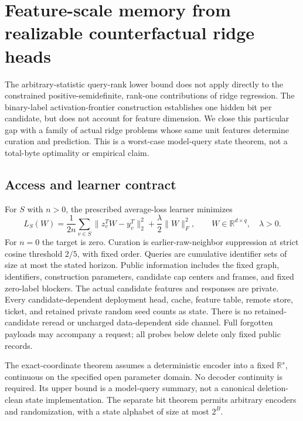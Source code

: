 \section{Feature-scale memory from realizable counterfactual ridge heads}
\label{sec:realizable-feature-memory}

The arbitrary-statistic query-rank lower bound does not apply directly to
the constrained positive-semidefinite, rank-one contributions of ridge
regression.  The binary-label activation-frontier construction establishes
one hidden bit per candidate, but does not account for feature dimension.
We close this particular gap with a family of actual ridge problems whose
same unit features determine curation and prediction.  This is a worst-case
model-query state theorem, not a total-byte optimality or empirical claim.

\subsection{Access and learner contract}
For $S$ with $n>0$, the prescribed average-loss learner minimizes
\[
 L_S(W)=\frac1{2n}\sum_{v\in S}\|z_v^TW-y_v^T\|_2^2
                      +\frac\lambda2\|W\|_F^2,
 \qquad W\in\mathbb R^{d\times q},\quad\lambda>0.
\]
For $n=0$ the target is zero.  Curation is earlier-raw-neighbor suppression
at strict cosine threshold $2/5$, with fixed order.  Queries are cumulative
identifier sets of size at most the stated horizon.  Public information
includes the fixed graph, identifiers, construction parameters, candidate
cap centers and frames, and fixed zero-label blockers.  The actual candidate
features and responses are private.  Every candidate-dependent deployment
head, cache, feature table, remote store, ticket, and retained private random
seed counts as state.  There is no retained-candidate reread or uncharged
data-dependent side channel.  Full forgotten payloads may accompany a
request; all probes below delete only fixed public records.

The exact-coordinate theorem assumes a deterministic encoder into a fixed
$\mathbb R^s$, continuous on the specified open parameter domain.  No
decoder continuity is required.  Its upper bound is a model-query summary,
not a canonical deletion-clean state implementation.  The separate bit
theorem permits arbitrary encoders and randomization, with a state alphabet
of size at most $2^B$.

